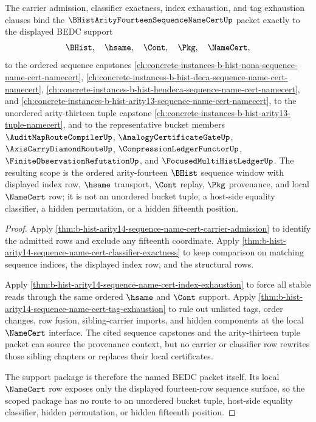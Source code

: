 \begin{theorem}
\label{thm:b-hist-arity14-sequence-name-cert-scoped-support-package}
The carrier admission, classifier exactness, index exhaustion, and tag exhaustion clauses bind the $\BHistArityFourteenSequenceNameCertUp$ packet exactly to the displayed BEDC support
$$
\BHist,\quad \hsame,\quad \Cont,\quad \Pkg,\quad \NameCert,
$$
to the ordered sequence capstones \autoref{ch:concrete-instances-b-hist-nona-sequence-name-cert-namecert}, \autoref{ch:concrete-instances-b-hist-deca-sequence-name-cert-namecert}, \autoref{ch:concrete-instances-b-hist-hendeca-sequence-name-cert-namecert}, and \autoref{ch:concrete-instances-b-hist-arity13-sequence-name-cert-namecert}, to the unordered arity-thirteen tuple capstone \autoref{ch:concrete-instances-b-hist-arity13-tuple-namecert}, and to the representative bucket members $\AuditMapRouteCompilerUp$, $\AnalogyCertificateGateUp$, $\AxisCarryDiamondRouteUp$, $\CompressionLedgerFunctorUp$, $\FiniteObservationRefutationUp$, and $\FocusedMultiHistLedgerUp$. The resulting scope is the ordered arity-fourteen $\BHist$ sequence window with displayed index row, $\hsame$ transport, $\Cont$ replay, $\Pkg$ provenance, and local $\NameCert$ row; it is not an unordered bucket tuple, a host-side equality classifier, a hidden permutation, or a hidden fifteenth position.
\end{theorem}
\begin{proof}
Apply \autoref{thm:b-hist-arity14-sequence-name-cert-carrier-admission} to identify the admitted rows and exclude any fifteenth coordinate. Apply \autoref{thm:b-hist-arity14-sequence-name-cert-classifier-exactness} to keep comparison on matching sequence indices, the displayed index row, and the structural rows.

Apply \autoref{thm:b-hist-arity14-sequence-name-cert-index-exhaustion} to force all stable reads through the same ordered $\hsame$ and $\Cont$ support. Apply \autoref{thm:b-hist-arity14-sequence-name-cert-tag-exhaustion} to rule out unlisted tags, order changes, row fusion, sibling-carrier imports, and hidden components at the local $\NameCert$ interface. The cited sequence capstones and the arity-thirteen tuple packet can source the provenance context, but no carrier or classifier row rewrites those sibling chapters or replaces their local certificates.

The support package is therefore the named BEDC packet itself. Its local $\NameCert$ row exposes only the displayed fourteen-row sequence surface, so the scoped package has no route to an unordered bucket tuple, host-side equality classifier, hidden permutation, or hidden fifteenth position.
\end{proof}

